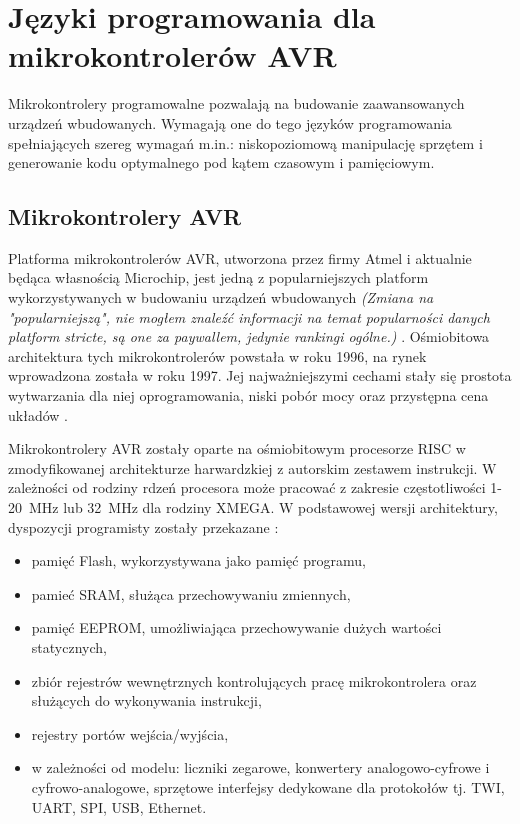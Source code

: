 \chapter{Języki programowania dla mikrokontrolerów AVR}
\label{ch:02}

Mikrokontrolery programowalne pozwalają na budowanie zaawansowanych urządzeń wbudowanych. Wymagają one do tego języków programowania spełniających szereg wymagań m.in.: niskopoziomową manipulację sprzętem i generowanie kodu optymalnego pod kątem czasowym i pamięciowym.

\section{Mikrokontrolery AVR}
Platforma mikrokontrolerów AVR, utworzona przez firmy Atmel i aktualnie będąca własnością Microchip, jest jedną z popularniejszych platform wykorzystywanych w budowaniu urządzeń wbudowanych \textit{(Zmiana na "popularniejszą", nie mogłem znaleźć informacji na temat popularności danych platform stricte, są one za paywallem, jedynie rankingi ogólne.) }. Ośmiobitowa architektura tych mikrokontrolerów powstała w roku 1996, na rynek wprowadzona została w roku 1997. Jej najważniejszymi cechami stały się prostota wytwarzania dla niej oprogramowania, niski pobór mocy oraz przystępna cena układów .

Mikrokontrolery AVR zostały oparte na ośmiobitowym procesorze RISC w zmodyfikowanej architekturze harwardzkiej z autorskim zestawem instrukcji. W zależności od rodziny rdzeń procesora może pracować z zakresie częstotliwości 1-20~MHz lub 32~MHz dla rodziny XMEGA.
W podstawowej wersji architektury, dyspozycji programisty zostały przekazane :
\begin{itemize}
\item pamięć Flash, wykorzystywana jako pamięć programu,
\item pamieć SRAM, służąca przechowywaniu zmiennych,
\item pamięć EEPROM, umożliwiająca przechowywanie dużych wartości statycznych,
\item zbiór rejestrów wewnętrznych kontrolujących pracę mikrokontrolera oraz służących do wykonywania instrukcji,
\item rejestry portów wejścia/wyjścia,
\item w zależności od modelu: liczniki zegarowe, konwertery analogowo-cyfrowe i cyfrowo-analogowe, sprzętowe interfejsy dedykowane dla protokołów tj. TWI, UART, SPI, USB, Ethernet.
\end{itemize}

